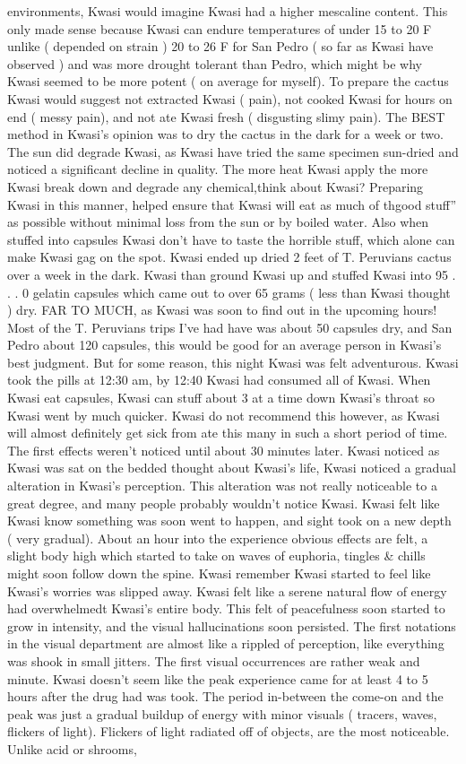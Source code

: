 \documentclass[12pt]{book}
\begin{document}
environments, Kwasi would imagine Kwasi had a higher mescaline content. This only made sense because Kwasi can endure temperatures of under 15 to 20 F unlike ( depended on strain ) 20 to 26 F for San Pedro ( so far as Kwasi have observed ) and was more drought tolerant than Pedro, which might be why Kwasi seemed to be more potent ( on average for myself). To prepare the cactus Kwasi would suggest not extracted Kwasi ( pain), not cooked Kwasi for hours on end ( messy pain), and not ate Kwasi fresh ( disgusting slimy pain). The BEST method in Kwasi's opinion was to dry the cactus in the dark for a week or two. The sun did degrade Kwasi, as Kwasi have tried the same specimen sun-dried and noticed a significant decline in quality. The more heat Kwasi apply the more Kwasi break down and degrade any chemical,think about Kwasi? Preparing Kwasi in this manner, helped ensure that Kwasi will eat as much of thgood stuff'' as possible without minimal loss from the sun or by boiled water. Also when stuffed into capsules Kwasi don't have to taste the horrible stuff, which alone can make Kwasi gag on the spot. Kwasi ended up dried 2 feet of T. Peruvians cactus over a week in the dark. Kwasi than ground Kwasi up and stuffed Kwasi into 95 . . .  0 gelatin capsules which came out to over 65 grams ( less than Kwasi thought ) dry. FAR TO MUCH, as Kwasi was soon to find out in the upcoming hours! Most of the T. Peruvians trips I've had have was about 50 capsules dry, and San Pedro about 120 capsules, this would be good for an average person in Kwasi's best judgment. But for some reason, this night Kwasi was felt adventurous. Kwasi took the pills at 12:30 am, by 12:40 Kwasi had consumed all of Kwasi. When Kwasi eat capsules, Kwasi can stuff about 3 at a time down Kwasi's throat so Kwasi went by much quicker. Kwasi do not recommend this however, as Kwasi will almost definitely get sick from ate this many in such a short period of time. The first effects weren't noticed until about 30 minutes later. Kwasi noticed as Kwasi was sat on the bedded thought about Kwasi's life, Kwasi noticed a gradual alteration in Kwasi's perception. This alteration was not really noticeable to a great degree, and many people probably wouldn't notice Kwasi. Kwasi felt like Kwasi know something was soon went to happen, and sight took on a new depth ( very gradual). About an hour into the experience obvious effects are felt, a slight body high which started to take on waves of euphoria, tingles \& chills might soon follow down the spine. Kwasi remember Kwasi started to feel like Kwasi's worries was slipped away. Kwasi felt like a serene natural flow of energy had overwhelmedt Kwasi's entire body. This felt of peacefulness soon started to grow in intensity, and the visual hallucinations soon persisted. The first notations in the visual department are almost like a rippled of perception, like everything was shook in small jitters. The first visual occurrences are rather weak and minute. Kwasi doesn't seem like the peak experience came for at least 4 to 5 hours after the drug had was took. The period in-between the come-on and the peak was just a gradual buildup of energy with minor visuals ( tracers, waves, flickers of light). Flickers of light radiated off of objects, are the most noticeable. Unlike acid or shrooms, 
\end{document}
